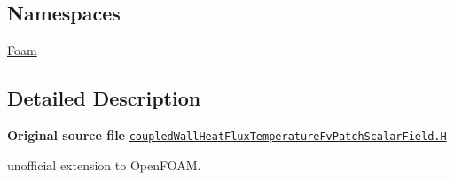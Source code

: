 \subsection*{Namespaces}
\begin{DoxyCompactItemize}
\item 
 \hyperlink{namespaceFoam}{Foam}
\end{DoxyCompactItemize}


\subsection{Detailed Description}
{\bfseries Original source file} \href{../../../home/carlo/data/GeN-Foam/GeN-Foam_ffn/GeN-Foam/GeN-Foam/FMU4FOAM/ECI4FOAM/src/externalComm/externalIO/input/BC/coupledWallHeatFluxTemperature/coupledWallHeatFluxTemperatureFvPatchScalarField.H}{\tt coupled\+Wall\+Heat\+Flux\+Temperature\+Fv\+Patch\+Scalar\+Field.\+H}

\begin{DoxyVerb}unofficial extension to OpenFOAM.\end{DoxyVerb}
